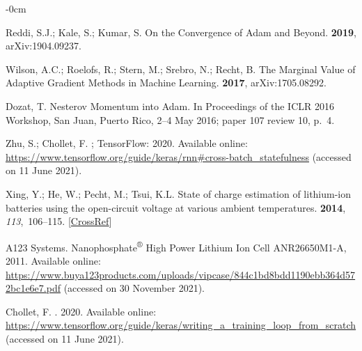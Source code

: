 \documentclass[energies,article,accept,pdftex,moreauthors]{Definitions/mdpi}
\begin{document}
\begin{adjustwidth}{-\extralength}{0cm}
\begin{thebibliography}{999}
    Reddi, S.J.; Kale, S.; Kumar, S.
    \newblock On the {Convergence} of {Adam} and {Beyond}.
     {\bf 2019}, arXiv:1904.09237.
    
    Wilson, A.C.; Roelofs, R.; Stern, M.; Srebro, N.; Recht, B.
    \newblock The {Marginal} {Value} of {Adaptive} {Gradient} {Methods} in
    {Machine} {Learning}.
     {\bf 2017}, arXiv:1705.08292.
    
    Dozat, T.
     {Nesterov} {Momentum} {into} {Adam}.
    \newblock In Proceedings of the ICLR 2016 Workshop, San Juan, Puerto Rico, 2--4 May 2016; paper 107 review 10, p.~4.
    
    Zhu, S.; Chollet, F.
    ; TensorFlow: 2020.
    \newblock Available online: \url{https://www.tensorflow.org/guide/keras/rnn#cross-batch_statefulness}
    \newblock (accessed on 11 June 2021).
    
    Xing, Y.; He, W.; Pecht, M.; Tsui, K.L.
    \newblock State of charge estimation of lithium-ion batteries using the
    open-circuit voltage at various ambient temperatures.
     {\bf 2014}, {\em 113},~106--115. [\href{http://dx.doi.org/10.1016/j.apenergy.2013.07.008}{CrossRef}]
    
    {A123 Systems}.
    \newblock Nanophosphate\textsuperscript{®} {High} {Power} {Lithium} {Ion} {Cell}
    {ANR26650M1}-{A},  2011.
    \newblock Available online: \url{https://www.buya123products.com/uploads/vipcase/844c1bd8bdd1190ebb364d572bc1e6e7.pdf}
    \newblock (accessed on 30 November   2021).
    
    Chollet, F.
    . 2020.
    \newblock Available online: \url{https://www.tensorflow.org/guide/keras/writing_a_training_loop_from_scratch}
    \newblock (accessed on 11 June  2021).
    

\end{thebibliography}
\end{adjustwidth}
\end{document}
